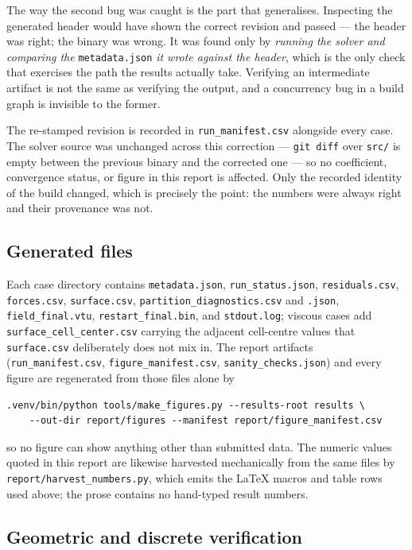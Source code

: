 The way the second bug was caught is the part that generalises. Inspecting the generated
header would have shown the correct revision and passed --- the header was right; the binary
was wrong. It was found only by \emph{running the solver and comparing the}
\texttt{metadata.json} \emph{it wrote against the header}, which is the only check that
exercises the path the results actually take. Verifying an intermediate artifact is not the
same as verifying the output, and a concurrency bug in a build graph is invisible to the
former.

The re-stamped revision is recorded in \texttt{run\_manifest.csv} alongside every case. The
solver source was unchanged across this correction --- \texttt{git diff} over \texttt{src/}
is empty between the previous binary and the corrected one --- so no coefficient, convergence
status, or figure in this report is affected. Only the recorded identity of the build
changed, which is precisely the point: the numbers were always right and their provenance was
not.

\subsection{Generated files}

Each case directory contains \texttt{metadata.json},
\texttt{run\_status.json}, \texttt{residuals.csv}, \texttt{forces.csv},
\texttt{surface.csv}, \texttt{partition\_diagnostics.csv} and
\texttt{.json}, \texttt{field\_final.vtu}, \texttt{restart\_final.bin}, and
\texttt{stdout.log}; viscous cases add
\texttt{surface\_cell\_center.csv} carrying the adjacent cell-centre values that
\texttt{surface.csv} deliberately does not mix in. The report artifacts
(\texttt{run\_manifest.csv}, \texttt{figure\_manifest.csv},
\texttt{sanity\_checks.json}) and every figure are regenerated from those files
alone by

\begin{verbatim}
.venv/bin/python tools/make_figures.py --results-root results \
    --out-dir report/figures --manifest report/figure_manifest.csv
\end{verbatim}

so no figure can show anything other than submitted data. The numeric values
quoted in this report are likewise harvested mechanically from the same files by
\texttt{report/harvest\_numbers.py}, which emits the LaTeX macros and table rows
used above; the prose contains no hand-typed result numbers.

\subsection{Geometric and discrete verification}
\label{sec:meshverif}

